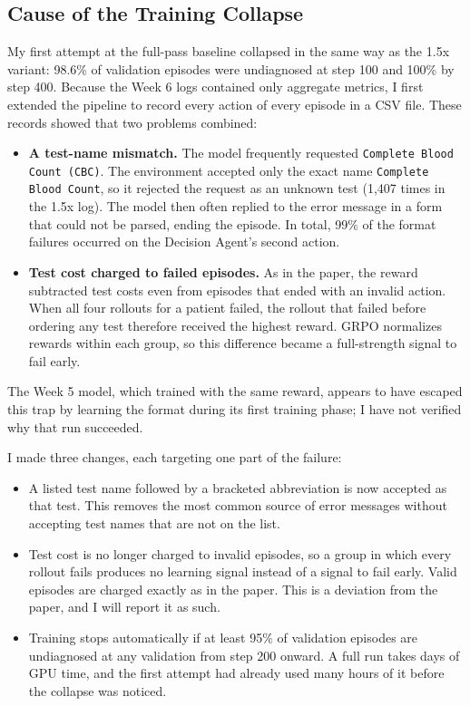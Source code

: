 \documentclass[11pt]{article}
\begin{document}
\subsection*{Cause of the Training Collapse}

My first attempt at the full-pass baseline collapsed in the same way as the
1.5x variant: 98.6\% of validation episodes were undiagnosed at step 100 and
100\% by step 400. Because the Week 6 logs contained only aggregate metrics, I
first extended the pipeline to record every action of every episode in a CSV
file. These records showed that two problems combined:

\begin{itemize}
  \item \textbf{A test-name mismatch.} The model frequently requested
        \texttt{Complete Blood Count (CBC)}. The environment accepted only the
        exact name \texttt{Complete Blood Count}, so it rejected the request as
        an unknown test (1,407 times in the 1.5x log). The model then often
        replied to the error message in a form that could not be parsed,
        ending the episode. In total, 99\% of the format failures occurred on
        the Decision Agent's second action.
  \item \textbf{Test cost charged to failed episodes.} As in the paper, the
        reward subtracted test costs even from episodes that ended with an
        invalid action. When all four rollouts for a patient failed, the
        rollout that failed before ordering any test therefore received the
        highest reward. GRPO normalizes rewards within each group, so this
        difference became a full-strength signal to fail early.
\end{itemize}

The Week 5 model, which trained with the same reward, appears to have escaped
this trap by learning the format during its first training phase; I have not
verified why that run succeeded.

I made three changes, each targeting one part of the failure:

\begin{itemize}
  \item A listed test name followed by a bracketed abbreviation is now
        accepted as that test. This removes the most common source of error
        messages without accepting test names that are not on the list.
  \item Test cost is no longer charged to invalid episodes, so a group in
        which every rollout fails produces no learning signal instead of a
        signal to fail early. Valid episodes are charged exactly as in the
        paper. This is a deviation from the paper, and I will report it as
        such.
  \item Training stops automatically if at least 95\% of validation episodes
        are undiagnosed at any validation from step 200 onward. A full run
        takes days of GPU time, and the first attempt had already used many
        hours of it before the collapse was noticed.
\end{itemize}
\end{document}
